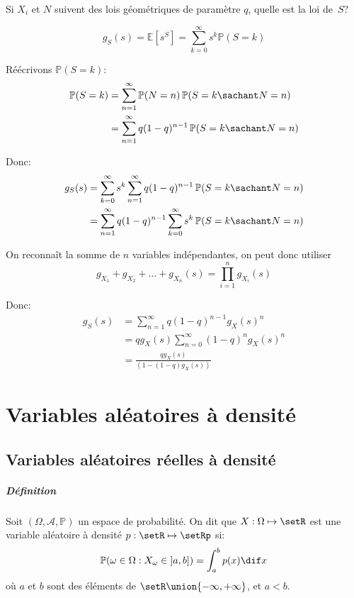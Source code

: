 \documentclass[a4paper,10pt,french,openany]{memoir}
\newcommand{\Proba}{\mathbb{P}}
\newcommand{\Esper}{\mathbb{E}}
\newcommand{\tribu}[1]{\mathcal{#1}}
\begin{document}
Si $X_i$ et $N$ suivent des lois géométriques de paramètre $q$, quelle est la loi de~$S$?

\[
 g_S(s) = \Esper[s^S] = \sum_{k=0}^\infty s^k \Proba(S=k)
\]

Réécrivons $\Proba(S=k)$:
\begin{align*}
 \Proba(S=k) &= \sum_{n=1}^\infty \Proba(N=n)\,\Proba(S=k \sachant N = n)\\
 &= \sum_{n=1}^\infty q (1-q)^{n-1} \,\Proba(S=k\sachant N=n)
\end{align*}

Donc:
\begin{align*}
 g_S(s) &= \sum_{k=0}^\infty s^k \sum_{n=1}^\infty q (1-q)^{n-1} \,\Proba(S=k\sachant N=n) \\
 &= \sum_{n=1}^\infty q (1-q)^{n-1} \sum_{k=0}^\infty s^k \,\Proba(S=k\sachant N=n)
\end{align*}

On reconnaît la somme de $n$ variables indépendantes, on peut donc utiliser \[g_{X_1} + g_{X_2} + \dots + g_{X_n} (s) = \prod_{i=1}^n g_{X_i} (s)\]

Donc:
\begin{align*}
 g_S(s) &= \sum_{n=1}^\infty q (1-q)^{n-1} g_X(s)^n\\
 &= q g_X(s) \sum_{n=0}^\infty (1-q)^n g_X (s)^n\\
 &= \frac{q g_X(s)}{(1-(1-q) g_X(s))}
\end{align*}

\chapter{Variables aléatoires à densité}

\section{Variables aléatoires réelles à densité}

\paragraph{Définition}
Soit $(\Omega, \tribu A, \Proba)$ un espace de probabilité. On dit que $X:\Omega\mapsto\setR$ est une variable aléatoire à densité $p:\setR\mapsto\setRp$ si:
\[\Proba(\omega\in\Omega: X_\omega \in \;]a,b])=\int_a^b p(x) \dif x\]
où $a$ et $b$ sont des éléments de $\setR\union\lbrace-\infty,+\infty\rbrace$, et $a<b$.
\end{document}
